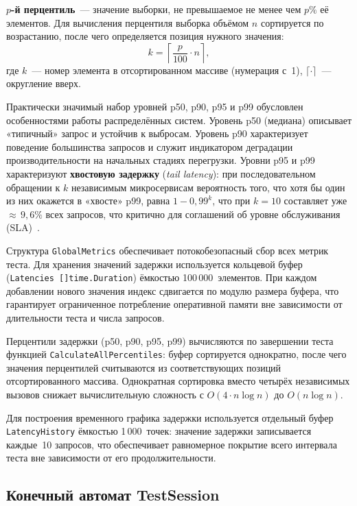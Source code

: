 \textbf{$p$-й перцентиль}~--- значение выборки, не превышаемое не менее чем $p\%$
её элементов.
Для вычисления перцентиля выборка объёмом $n$ сортируется по возрастанию,
после чего определяется позиция нужного значения:
\begin{equation}
  k = \left\lceil \frac{p}{100} \cdot n \right\rceil,
  \label{eq:percentile}
\end{equation}
где $k$~--- номер элемента в отсортированном массиве (нумерация с~1),
$\lceil \cdot \rceil$~--- округление вверх.

Практически значимый набор уровней p50, p90, p95 и p99 обусловлен
особенностями работы распределённых систем.
Уровень p50 (медиана) описывает «типичный» запрос и устойчив к выбросам.
Уровень p90 характеризует поведение большинства запросов и служит
индикатором деградации производительности на начальных стадиях перегрузки.
Уровни p95 и p99 характеризуют \textbf{хвостовую задержку} (\textit{tail latency}):
при последовательном обращении к $k$ независимым микросервисам
вероятность того, что хотя бы один из них окажется в «хвосте» p99,
равна $1 - 0{,}99^k$, что при $k = 10$ составляет уже ${\approx}\,9{,}6\%$
всех запросов, что критично для соглашений об уровне обслуживания (SLA)~\cite[с.~187]{akinshin2022}.

Структура \texttt{GlobalMetrics} обеспечивает потокобезопасный сбор всех метрик теста.
Для хранения значений задержки используется кольцевой буфер
(\texttt{Latencies []time.Duration}) ёмкостью 100\,000~элементов.
При каждом добавлении нового значения индекс сдвигается по модулю размера буфера,
что гарантирует ограниченное потребление оперативной памяти
вне зависимости от длительности теста и числа запросов.

Перцентили задержки (p50, p90, p95, p99) вычисляются по завершении теста
функцией \texttt{CalculateAllPercentiles}: буфер сортируется однократно,
после чего значения перцентилей считываются из соответствующих позиций
отсортированного массива.
Однократная сортировка вместо четырёх независимых вызовов снижает вычислительную
сложность с $O(4 \cdot n \log n)$ до $O(n \log n)$.

Для построения временного графика задержки используется отдельный буфер
\texttt{LatencyHistory} ёмкостью 1\,000~точек: значение задержки записывается
каждые~10 запросов, что обеспечивает равномерное покрытие всего интервала теста
вне зависимости от его продолжительности.

\subsection*{Конечный автомат TestSession}

